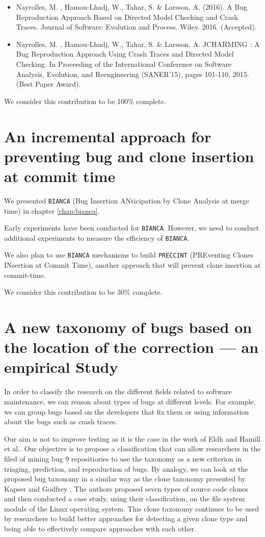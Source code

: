 \begin{itemize}
	\item Nayrolles, M. , Hamou-Lhadj, W., Tahar, S. & Larsson, A. (2016). A Bug Reproduction Approach Based on Directed Model Checking and Crash Traces. Journal of Software: Evolution and Process. Wiley. 2016. (Accepted).
	\item Nayrolles, M. , Hamou-Lhadj, W., Tahar, S. & Larsson, A. JCHARMING : A Bug Reproduction Approach Using Crash Traces and Directed Model Checking. In Proceeding of the International Conference on Software Analysis, Evolution, and Reengineering (SANER'15), pages 101-110, 2015. (Best Paper Award).
\end{itemize}

We consider this contribution to be 100\% complete.

\section{An incremental approach for preventing bug and clone insertion at commit time}

We presented  {\tt BIANCA} (Bug Insertion ANticipation by Clone Analysis at merge time) in chapter \ref{chap:bianca}.

Early experiments have been conducted for {\tt BIANCA}.
However, we need to conduct additional experiments to measure the efficiency of {\tt BIANCA}.

We also plan to use {\tt BIANCA} mechanisms to build {\tt PRECCINT} (PREventing Clones INsertion at Commit Time), another approach that will prevent clone insertion at commit-time.

We consider this contribution to be 30\% complete.

\section{A new taxonomy of bugs based on the location of the correction --- an empirical Study}


In order to classify the research on the different fields related to software maintenance, we can reason about types of bugs at different levels. For
example, we can group bugs based on the developers that fix
them or using information about the bugs such as crash traces.


Our aim is not to improve testing as it is the case in the work of Eldh \cite{Eldh2001} and Hamill et al.\cite{Hamill2014}.
Our objective is to propose a classification that can allow researchers in the filed of mining bug 9 repositiories to use the taxonomy as a new criterion in triaging, prediction, and reproduction of bugs.
By analogy, we can look at the proposed bug taxonomy in a similar way as the clone taxonomy presented by Kapser and Godfrey \cite{CoryKapser}.
The authors proposed seven types of source code clones and then conducted a case study, using their classification, on the file system module of the Linux operating system.
This clone taxonomy continues to be used by researchers to build better approaches for detecting a given clone type and being able to effectively compare approaches with each other.

